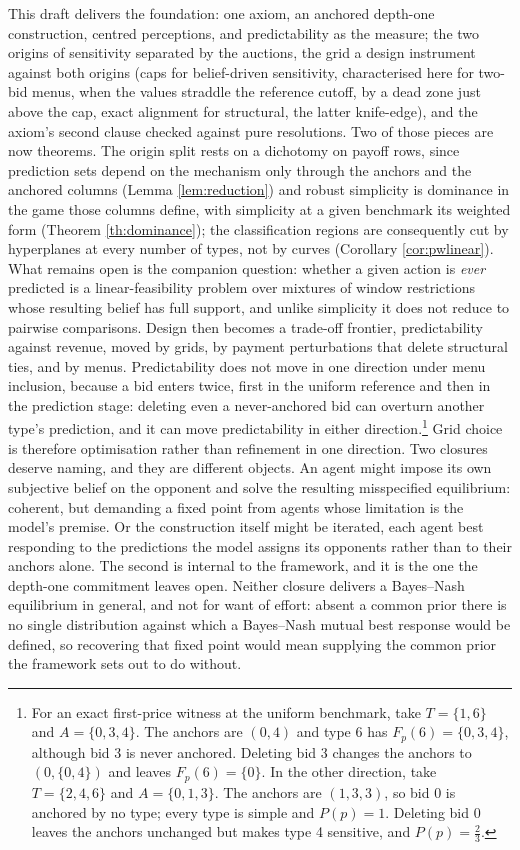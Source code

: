 \documentclass[12pt]{article}
\theoremstyle{definition}
\begin{document}
This draft delivers the foundation: one axiom, an anchored depth-one construction, centred perceptions, and predictability as the measure; the two origins of sensitivity separated by the auctions, the grid a design instrument against both origins (caps for belief-driven sensitivity, characterised here for two-bid menus, when the values straddle the reference cutoff, by a dead zone just above the cap, exact alignment for structural, the latter knife-edge), and the axiom's second clause checked against pure resolutions. Two of those pieces are now theorems. The origin split rests on a dichotomy on payoff rows, since prediction sets depend on the mechanism only through the anchors and the anchored columns (Lemma \ref{lem:reduction}) and robust simplicity is dominance in the game those columns define, with simplicity at a given benchmark its weighted form (Theorem \ref{th:dominance}); the classification regions are consequently cut by hyperplanes at every number of types, not by curves (Corollary \ref{cor:pwlinear}). What remains open is the companion question: whether a given action is \emph{ever} predicted is a linear-feasibility problem over mixtures of window restrictions whose resulting belief has full support, and unlike simplicity it does not reduce to pairwise comparisons. Design then becomes a trade-off frontier, predictability against revenue, moved by grids, by payment perturbations that delete structural ties, and by menus. Predictability does not move in one direction under menu inclusion, because a bid enters twice, first in the uniform reference and then in the prediction stage: deleting even a never-anchored bid can overturn another type's prediction, and it can move predictability in either direction.\footnote{For an exact first-price witness at the uniform benchmark, take $T=\{1,6\}$ and $A=\{0,3,4\}$. The anchors are $(0,4)$ and type 6 has $F_p(6)=\{0,3,4\}$, although bid 3 is never anchored. Deleting bid 3 changes the anchors to $(0,\{0,4\})$ and leaves $F_p(6)=\{0\}$. In the other direction, take $T=\{2,4,6\}$ and $A=\{0,1,3\}$. The anchors are $(1,3,3)$, so bid 0 is anchored by no type; every type is simple and $P(p)=1$. Deleting bid 0 leaves the anchors unchanged but makes type 4 sensitive, and $P(p)=\tfrac23$.} Grid choice is therefore optimisation rather than refinement in one direction. Two closures deserve naming, and they are different objects. An agent might impose its own subjective belief on the opponent and solve the resulting misspecified equilibrium: coherent, but demanding a fixed point from agents whose limitation is the model's premise. Or the construction itself might be iterated, each agent best responding to the predictions the model assigns its opponents rather than to their anchors alone. The second is internal to the framework, and it is the one the depth-one commitment leaves open. Neither closure delivers a Bayes--Nash equilibrium in general, and not for want of effort: absent a common prior there is no single distribution against which a Bayes--Nash mutual best response would be defined, so recovering that fixed point would mean supplying the common prior the framework sets out to do without.
 
\end{document}

